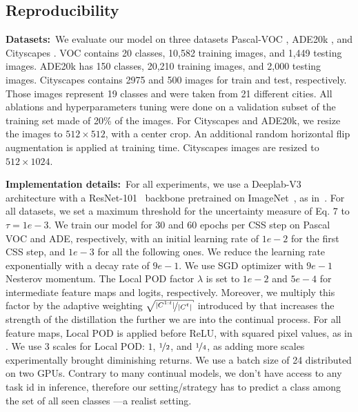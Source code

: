 \subsection{Reproducibility}

\noindent\textbf{Datasets:\,} We evaluate our model on three datasets Pascal-VOC
\citep{everingham2015pascalvoc}, ADE20k \citep{zhou2017adedataset}, and Cityscapes
\citep{cordts2016cityscapes}. VOC contains 20 classes, 10,582 training images, and 1,449 testing
images. ADE20k has 150 classes, 20,210 training images, and 2,000 testing images. Cityscapes
contains 2975 and 500 images for train and test, respectively. Those images represent 19 classes and
were taken from 21 different cities. All ablations and hyperparameters tuning were done on a
validation subset of the training set made of 20\% of the images. For Cityscapes and ADE20k, we
resize the images to $512 \times 512$, with a center crop. An additional random horizontal flip
augmentation is applied at training time. Cityscapes images are resized to $512 \times 1024$.

\noindent\textbf{Implementation details:\,} For all experiments, we use a
Deeplab-V3~\citep{chen2017deeplabv3} architecture with a ResNet-101~\citep{he2016resnet} backbone
pretrained on ImageNet~\citep{deng2009imagenet}, as in~\citep{cermelli2020modelingthebackground}.
For all datasets, we set a maximum threshold for the uncertainty measure of Eq. 7 to $\tau=1e-3$. We
train our model for 30 and 60 epochs per CSS step on Pascal VOC and ADE, respectively, with an
initial learning rate of $1e-2$ for the first CSS step, and $1e-3$ for all the following ones. We
reduce the learning rate exponentially with a decay rate of $9e-1$. We use SGD optimizer with $9e-1$
Nesterov momentum. The Local POD factor $\lambda$ is set to $1e-2$ and $5e-4$ for intermediate
feature maps and logits, respectively. Moreover, we multiply this factor by the adaptive weighting
$\sqrt{\nicefrac{|C^{1:t}|}{|C^{t}|}}$ introduced by \citet{hou2019ucir} that increases the strength
of the distillation the further we are into the continual process. For all feature maps, Local POD
is applied before ReLU, with squared pixel values, as in
\citep{zagoruyko2016distillation_attention}. We use 3 scales for Local POD: $1$, $\nicefrac{1}{2}$,
and $\nicefrac{1}{4}$, as adding more scales experimentally brought diminishing returns. We use a
batch size of 24 distributed on two GPUs. Contrary to many continual models, we don't have access to
any task id in inference, therefore our setting/strategy has to predict a class among the set of all
seen classes ---a realist setting.

